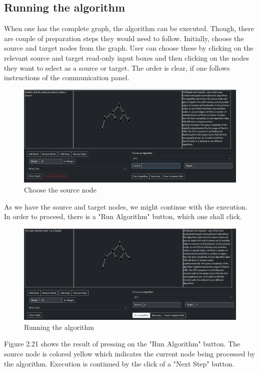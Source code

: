 \subsection{Running the algorithm}

When one has the complete graph, the algorithm can be executed. Though, there are couple of preparation steps they would need to follow. Initially, choose the source and target nodes from the graph. User can choose these by clicking on the relevant source and target read-only input boxes and then clicking on the nodes they want to select as a source or target. The order is clear, if one follows instructions of the communication panel.

\begin{figure}[H]
	\centering
	\includegraphics[width=\textwidth]{images/choosing_source_node.png}
	\caption{Choose the source node}
\end{figure}

As we have the source and target nodes, we might continue with the execution. In order to proceed, there is a "Run Algorithm" button, which one shall click.

\begin{figure}[H]
	\centering
	\includegraphics[width=\textwidth]{images/running_the_algo.png}
	\caption{Running the algorithm}
\end{figure}

Figure 2.21 shows the result of pressing on the "Run Algorithm" button. The source node is colored yellow which indicates the current node being processed by the algorithm. Execution is continued by the click of a "Next Step" button.

